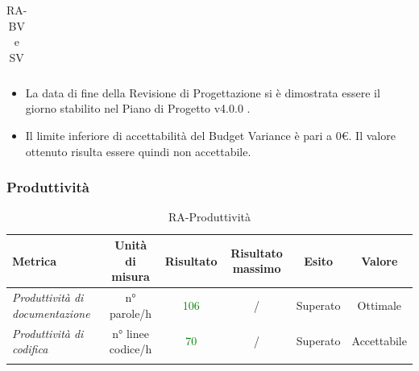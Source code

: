 {\begin{longtable}{|>{\centering}m{2cm}|c|c|c|c|c|}
  	\caption{RA- BV e SV}\\
  \end{longtable}
  
  
  
  
  \begin{itemize}
  	\item La data di fine della Revisione di Progettazione si è dimostrata essere il
  	giorno stabilito nel Piano di Progetto v4.0.0 .
  	\item  Il limite inferiore di accettabilità del Budget Variance è pari a 0€.
  	Il valore ottenuto risulta essere quindi non accettabile. 
  \end{itemize}
  
  \subsubsection{Produttività}
  
  \begin{longtable}{|>{\centering}m{2cm}|c|c|c|c|c|}
  	\hline
  	\textbf{Metrica} & \textbf{Unità di misura} & \textbf{Risultato} & \textbf{Risultato massimo} & \textbf{Esito} & \textbf{Valore}\\
  	\hline
  	\endhead
  	
  	\emph{Produttività di documentazione} & {n° parole/h} & \textcolor{Green}{106} & / & Superato & Ottimale \\ \hline
  	
  	
  	
  	\emph{Produttività di codifica} & {n° linee codice/h} & \textcolor{Green}{70} & / & Superato & Accettabile \\ \hline
  	
  	
  	
  	
  	\caption{RA-Produttività}\\
  \end{longtable}
  
  
  
  
  
}
